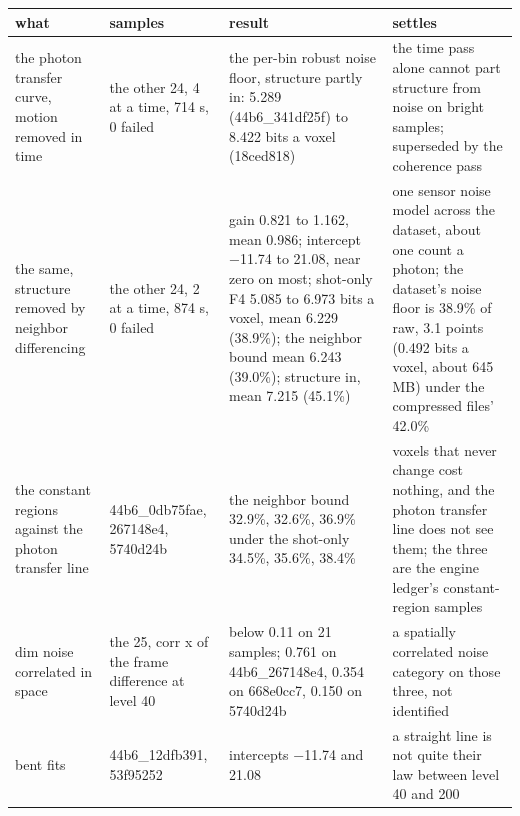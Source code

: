 {\footnotesize
\setlength{\tabcolsep}{6pt}
\begin{longtable}{>{\RaggedRight\arraybackslash}p{}>{\RaggedRight\arraybackslash}p{}>{\RaggedRight\arraybackslash}p{}>{\RaggedRight\arraybackslash}p{}}
\toprule
what & samples & result & settles \\
\midrule
\endhead
the photon transfer curve, motion removed in time & the other 24, 4 at a time, 714 s, 0 failed & the per-bin robust noise floor, structure partly in: 5.289 (44b6\_\allowbreak{}341df25f) to 8.422 bits a voxel (18ced818) & the time pass alone cannot part structure from noise on bright samples; superseded by the coherence pass \\
the same, structure removed by neighbor differencing & the other 24, 2 at a time, 874 s, 0 failed & gain 0.821 to 1.162, mean 0.986; intercept −11.74 to 21.08, near zero on most; shot-only F4 5.085 to 6.973 bits a voxel, mean 6.229 (38.9\%); the neighbor bound mean 6.243 (39.0\%); structure in, mean 7.215 (45.1\%) & one sensor noise model across the dataset, about one count a photon; the dataset's noise floor is 38.9\% of raw, 3.1 points (0.492 bits a voxel, about 645 MB) under the compressed files' 42.0\% \\
the constant regions against the photon transfer line & 44b6\_\allowbreak{}0db75fae, 267148e4, 5740d24b & the neighbor bound 32.9\%, 32.6\%, 36.9\% under the shot-only 34.5\%, 35.6\%, 38.4\% & voxels that never change cost nothing, and the photon transfer line does not see them; the three are the engine ledger's constant-region samples \\
dim noise correlated in space & the 25, corr x of the frame difference at level 40 & below 0.11 on 21 samples; 0.761 on 44b6\_\allowbreak{}267148e4, 0.354 on 668e0cc7, 0.150 on 5740d24b & a spatially correlated noise category on those three, not identified \\
bent fits & 44b6\_\allowbreak{}12dfb391, 53f95252 & intercepts −11.74 and 21.08 & a straight line is not quite their law between level 40 and 200 \\
\bottomrule
\end{longtable}
}
